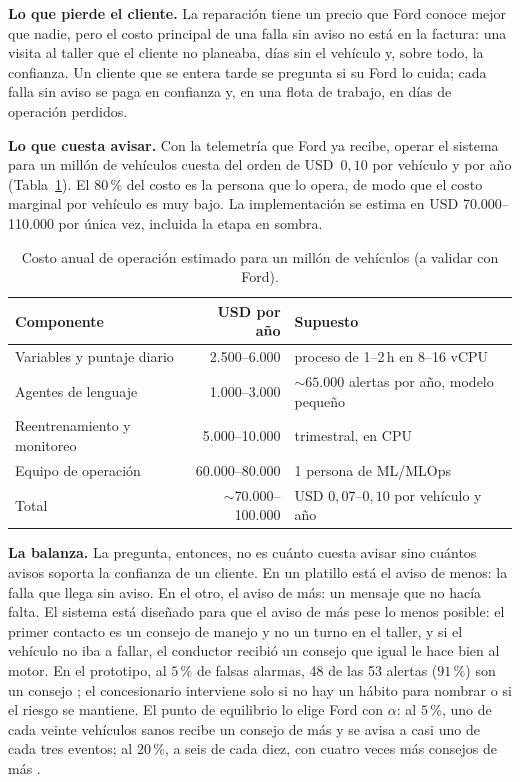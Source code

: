 \textbf{Lo que pierde el cliente.} La reparación tiene un precio que Ford conoce mejor que nadie, pero el costo principal de
una falla sin aviso no está en la factura: una visita al taller que el cliente no planeaba, días sin el vehículo y, sobre
todo, la confianza. Un cliente que se entera tarde se pregunta si su Ford lo cuida; cada falla sin aviso se paga en
confianza y, en una flota de trabajo, en días de operación perdidos.

\textbf{Lo que cuesta avisar.} Con la telemetría que Ford ya recibe, operar el sistema para un millón de vehículos cuesta
del orden de USD~$0{,}10$ por vehículo y por año (Tabla~\ref{tab:costo}). El $80\,\%$ del costo es la persona que lo
opera, de modo que el costo marginal por vehículo es muy bajo. La implementación se estima en USD 70.000--110.000 por única
vez, incluida la etapa en sombra.

\begin{table}[!htbp]
\centering
\caption{Costo anual de operación estimado para un millón de vehículos (a validar con Ford).}
\label{tab:costo}
\begin{tabular}{@{}lrl@{}}
\toprule
Componente & USD por año & Supuesto \\
\midrule
Variables y puntaje diario & 2.500--6.000 & proceso de 1--2\,h en 8--16 vCPU \\
Agentes de lenguaje & 1.000--3.000 & $\sim 65.000$ alertas por año, modelo pequeño \\
Reentrenamiento y monitoreo & 5.000--10.000 & trimestral, en CPU \\
Equipo de operación & 60.000--80.000 & 1 persona de ML/MLOps \\
\midrule
Total & $\sim$70.000--100.000 & USD $0{,}07$--$0{,}10$ por vehículo y año \\
\bottomrule
\end{tabular}
\end{table}

\textbf{La balanza.} La pregunta, entonces, no es cuánto cuesta avisar sino cuántos avisos soporta la confianza de un
cliente. En un platillo está el aviso de menos: la falla que llega sin aviso. En el otro, el aviso de más: un mensaje que no
hacía falta. El sistema está diseñado para que el aviso de más pese lo menos posible: el primer contacto es un consejo de
manejo y no un turno en el taller, y si el vehículo no iba a fallar, el conductor recibió un consejo que igual le hace bien
al motor. En el prototipo, al $5\,\%$ de falsas alarmas, 48 de las 53 alertas ($91\,\%$) son un consejo \tagdev{}; el
concesionario interviene solo si no hay un hábito para nombrar o si el riesgo se mantiene. El punto de equilibrio lo elige
Ford con $\alpha$: al $5\,\%$, uno de cada veinte vehículos sanos recibe un consejo de más y se avisa a casi uno de cada
tres eventos; al $20\,\%$, a seis de cada diez, con cuatro veces más consejos de más \tagtest{}.

